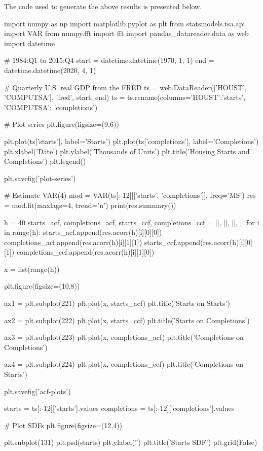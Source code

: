 \documentclass[oneside,reqno]{amsart}
\theoremstyle{definition}
\begin{document}
The code used to generate the above results is presented below. 
\begin{python3code}
import numpy as np
import matplotlib.pyplot as plt
from statsmodels.tsa.api import VAR
from numpy.fft import fft
import pandas_datareader.data as web
import datetime

# 1984:Q1 to 2015:Q4
start = datetime.datetime(1970, 1, 1)
end = datetime.datetime(2020, 4, 1)

# Quarterly U.S. real GDP from the FRED
ts = web.DataReader(['HOUST', 'COMPUTSA'], 'fred', start, end)
ts = ts.rename(columns={'HOUST':'starts', 'COMPUTSA': 'completions'})

# Plot series
plt.figure(figsize=(9,6))

plt.plot(ts['starts'], label='Starts')
plt.plot(ts['completions'], label='Completions')
plt.xlabel('Date')
plt.ylabel('Thousands of Units')
plt.title('Housing Starts and Completions')
plt.legend()

plt.savefig('plot-series')

# Estimate VAR(4)
mod = VAR(ts[:-12][['starts', 'completions']], freq='MS')
res = mod.fit(maxlags=4, trend='n')
print(res.summary())

h = 40
starts_acf, completions_acf, starts_ccf, completions_ccf = [], [], [], []
for i in range(h):
    starts_acf.append(res.acorr(h)[i][0][0])
    completions_acf.append(res.acorr(h)[i][1][1])
    starts_ccf.append(res.acorr(h)[i][0][1])
    completions_ccf.append(res.acorr(h)[i][1][0])
    
    
x = list(range(h))

plt.figure(figsize=(10,8))

ax1 = plt.subplot(221)
plt.plot(x, starts_acf)
plt.title('Starts on Starts')

ax2 = plt.subplot(222)
plt.plot(x, starts_ccf)
plt.title('Starts on Completions')


ax3 = plt.subplot(223)
plt.plot(x, completions_acf)
plt.title('Completions on Completions')

ax4 = plt.subplot(224)
plt.plot(x, completions_ccf)
plt.title('Completions on Starts')

plt.savefig('acf-plots')

starts = ts[:-12]['starts'].values
completions = ts[:-12]['completions'].values

# Plot SDFs
plt.figure(figsize=(12,4))

plt.subplot(131)
plt.psd(starts)
plt.ylabel('')
plt.title('Starts SDF')
plt.grid(False)


\end{python3code}
\end{document}
